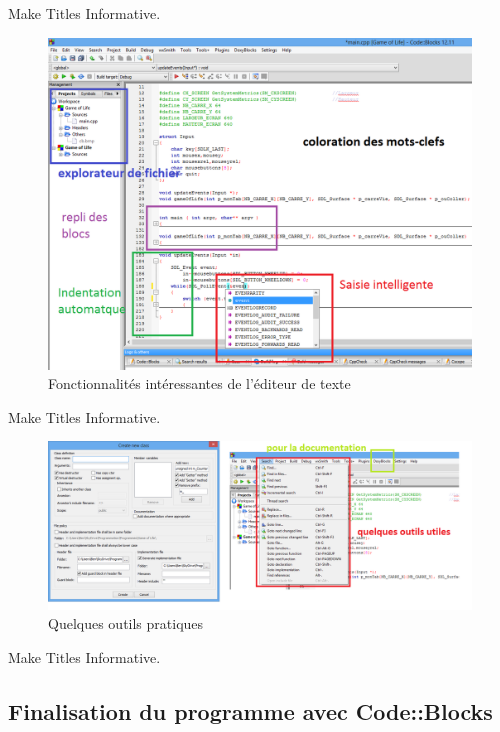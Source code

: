 \documentclass{beamer}
\begin{document}
\begin{frame}{Make Titles Informative.}
\begin{figure}
\includegraphics[scale=0.55]{../images/cb04.png}
\caption{Fonctionnalités intéressantes de l'éditeur de texte}				
\label{cb04}				
\end{figure}
\end{frame}

\begin{frame}{Make Titles Informative.}
\begin{figure}
\includegraphics[scale=0.45]{../images/cb05.png}
\caption{Quelques outils pratiques}				
\label{cb05}				
\end{figure}
\end{frame}

\begin{frame}{Make Titles Informative.}
\end{frame}


\subsection{Finalisation du programme avec Code::Blocks}
\end{document}
